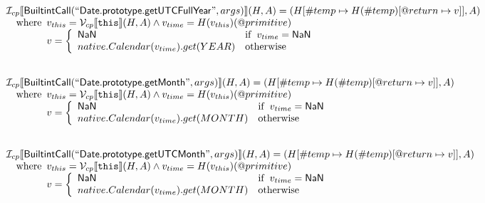 \[\begin{array}{l}
\mathcal{I} _{cp}\llbracket \mbox{\textsf{BuiltintCall}}(``\mbox{\textsf{Date.prototype.getUTCFullYear}}",args)\rrbracket(H,A)
  = (H[\#temp \mapsto H(\#temp)[@return \mapsto v]], A)\\
\quad{\rm where}\begin{array}[t]{l}
  v_{this} = \mathcal{V} _{cp}\llbracket \mbox{\texttt{this}}\rrbracket (H,A) \land v_{time} = H(v_{this})(@primitive)\\
  v = \left\{\begin{array}{ll}
    \mbox{\textsf{NaN}}  & {\rm if}\begin{array}[t]{l}v_{time} = \mbox{\textsf{NaN}}\end{array}\\
    native.Calendar(v_{time}).get(YEAR) & {\rm otherwise}
    \end{array}\right.
  \end{array}\\
\\\\

\mathcal{I} _{cp}\llbracket \mbox{\textsf{BuiltintCall}}(``\mbox{\textsf{Date.prototype.getMonth}}",args)\rrbracket(H,A)
  = (H[\#temp \mapsto H(\#temp)[@return \mapsto v]], A)\\
\quad{\rm where}\begin{array}[t]{l}
  v_{this} = \mathcal{V} _{cp}\llbracket \mbox{\texttt{this}}\rrbracket (H,A) \land v_{time} = H(v_{this})(@primitive)\\
  v = \left\{\begin{array}{ll}
    \mbox{\textsf{NaN}}  & {\rm if}\begin{array}[t]{l}v_{time} = \mbox{\textsf{NaN}}\end{array}\\
    native.Calendar(v_{time}).get(MONTH) & {\rm otherwise}
    \end{array}\right.
  \end{array}\\
\\\\

\mathcal{I} _{cp}\llbracket \mbox{\textsf{BuiltintCall}}(``\mbox{\textsf{Date.prototype.getUTCMonth}}",args)\rrbracket(H,A)
  = (H[\#temp \mapsto H(\#temp)[@return \mapsto v]], A)\\
\quad{\rm where}\begin{array}[t]{l}
  v_{this} = \mathcal{V} _{cp}\llbracket \mbox{\texttt{this}}\rrbracket (H,A) \land v_{time} = H(v_{this})(@primitive)\\
  v = \left\{\begin{array}{ll}
    \mbox{\textsf{NaN}}  & {\rm if}\begin{array}[t]{l}v_{time} = \mbox{\textsf{NaN}}\end{array}\\
    native.Calendar(v_{time}).get(MONTH) & {\rm otherwise}
    \end{array}\right.
  \end{array}\\
\\\\
\end{array}
\]


